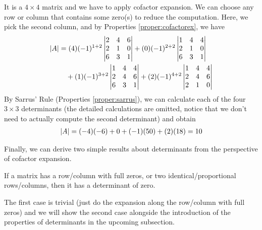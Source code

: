 \begin{solution}
It is a $4 \times 4$ matrix and we have to apply cofactor expansion. We can choose any row or column that contains some zero(s) to reduce the computation. Here, we pick the second column, and by Properties \ref{proper:cofactorex}, we have
\begin{align*}
\abs{A} &= 
(4)(-1)^{1+2}
\begin{vmatrix}
2 & 4 & 6 \\
2 & 1 & 0 \\
6 & 3 & 1 \\
\end{vmatrix}
+ (0)(-1)^{2+2}
\begin{vmatrix}
1 & 4 & 4 \\
2 & 1 & 0 \\
6 & 3 & 1 \\
\end{vmatrix} \\
& \quad + (1)(-1)^{3+2}
\begin{vmatrix}
1 & 4 & 4 \\
2 & 4 & 6 \\
6 & 3 & 1 \\
\end{vmatrix} 
+ (2)(-1)^{4+2}
\begin{vmatrix}
1 & 4 & 4 \\
2 & 4 & 6 \\
2 & 1 & 0
\end{vmatrix}     
\end{align*}
By Sarrus' Rule (Properties \ref{proper:sarrus}), we can calculate each of the four $3 \times 3$ determinants (the detailed calculations are omitted, notice that we don't need to actually compute the second determinant) and obtain
\begin{align*}
\abs{A} = (-4)(-6) + 0 + (-1)(50) + (2)(18) = 10
\end{align*}
\end{solution}
Finally, we can derive two simple results about determinants from the perspective of cofactor expansion.
\begin{proper}
\label{proper:zerodet}
If a matrix has a row/column with full zeros, or two identical/proportional rows/columns, then it has a determinant of zero.
\end{proper}
The first case is trivial (just do the expansion along the row/column with full zeros) and we will show the second case alongside the introduction of the properties of determinants in the upcoming subsection.

